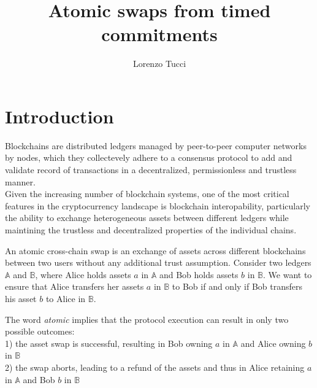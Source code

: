 \documentclass{article}      	%
\begin{document}
         
\author{Lorenzo Tucci}
\title{Atomic swaps from timed commitments}

\maketitle

\tableofcontents
\newpage
\section{Introduction}

Blockchains are distributed ledgers managed by peer-to-peer computer networks by nodes, which they collectevely adhere to a consensus protocol to add and validate record of transactions in a decentralized, permissionless and trustless manner. \\
Given the increasing number of blockchain systems, one of the most critical features in the cryptocurrency landscape is blockchain interopability, particularly the ability to exchange heterogeneous assets between different ledgers while maintining the trustless and decentralized properties of the individual chains. 

An atomic cross-chain swap is an exchange of assets across different blockchains between two users without any additional trust assumption. 
Consider two ledgers $\mathbb{A}$ and $\mathbb{B}$, where Alice holds assets $a$ in $\mathbb{A}$ and Bob holds assets $b$ in $\mathbb{B}$. We want to ensure that Alice transfers her assets $a$ in $\mathbb{B}$ to Bob if and only if Bob transfers his asset $b$ to Alice in $\mathbb{B}$.

The word \textit{atomic} implies that the protocol execution can result in only two possible outcomes: \\
1) the asset swap is successful, resulting in Bob owning $a$ in $\mathbb{A}$ and Alice owning $b$ in $\mathbb{B}$ \\
2) the swap aborts, leading to a refund of the assets and thus in Alice retaining $a$ in $\mathbb{A}$ and Bob $b$ in $\mathbb{B}$ 
\end{document}
